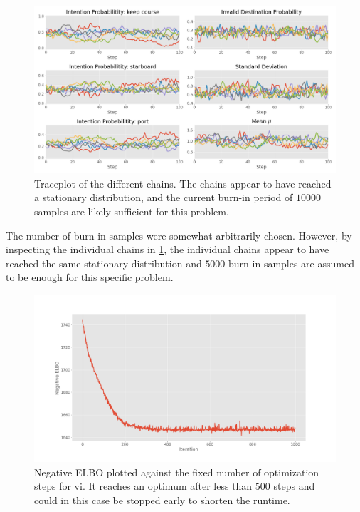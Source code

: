 \begin{figure}[h]
    \centering
    \includegraphics[width=\textwidth]{figures/example_mcmc_trace.png}
    \caption{Traceplot of the different chains. The chains appear to have reached a stationary distribution, and the current burn-in period of $10000$ samples are likely sufficient for this problem.}
    \label{fig:example_mcmc_trace}
\end{figure}

The number of burn-in samples were somewhat arbitrarily chosen. However, by inspecting the individual chains in \cref{fig:example_mcmc_trace}, the individual chains appear to have reached the same stationary distribution and $5000$ burn-in samples are assumed to be enough for this specific problem.

\begin{figure}[h]
    \centering
    \includegraphics[width=\textwidth]{figures/example_vi_losses.png}
    \caption{Negative ELBO plotted against the fixed number of optimization steps for \acrshort{vi}. It reaches an optimum after less than $500$ steps and could in this case be stopped early to shorten the runtime.}
    \label{fig:example_vi_losses}
\end{figure}















